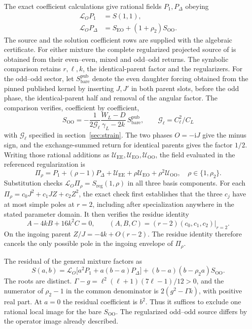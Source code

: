 \documentclass[11pt]{article}
\newcommand{\ii}{\mathrm{i}}
\newcommand{\EE}{\mathrm{EE}}
\newcommand{\EO}{\mathrm{EO}}
\newcommand{\OO}{\mathrm{OO}}
\begin{document}
The exact coefficient calculations give rational fields \(P_1,P_\Delta\) obeying
\begin{align}
 \mathcal L_O P_1&=S(1,1),\\
 \mathcal L_O P_\Delta&=S_{\EO}+(1+\rho_2)S_{\OO}.
 \label{eq:construction}
\end{align}
The source and the solution coefficient rows are supplied with the algebraic certificate.
For either mixture the complete regularized projected source of \cite{bucciotti} is obtained from their even--even, mixed and odd--odd returns.
The symbolic comparison retains \(r,\ell,k\), the identical-parent factor and the regularizers.
For the odd--odd sector, let \(S^{\mathrm{pub}}_{\mathrm{bare}}\) denote the even daughter forcing obtained from the pinned published kernel by inserting \(J,J'\) in both parent slots, before the odd phase, the identical-parent half and removal of the angular factor.
The comparison verifies, coefficient by coefficient,
\[
 S_{\OO}=-\frac{1}{2\mathcal G_\ell}
     \frac{W_L-D}{\gamma_L-2k}\,S^{\mathrm{pub}}_{\mathrm{bare}},
 \qquad \mathcal G_\ell=C_\ell^2/C_L
\]
with \(\mathcal G_\ell\) specified in section~\ref{sec:strain}.
The two phases \(O=-\ii J\) give the minus sign, and the exchange-summed return for identical parents gives the factor \(1/2\).
Writing those rational additions as \(\mathcal U_{\EE},\mathcal U_{\EO},\mathcal U_{\OO}\), the field evaluated in the referenced regularization is
\begin{equation}
 \Pi_\rho=P_1+(\rho-1)P_\Delta+
    \mathcal U_{\EE}+\rho\mathcal U_{\EO}+\rho^2\mathcal U_{\OO},
 \quad \rho\in\{1,\rho_2\}.
 \label{eq:Pi}
\end{equation}
Substitution checks \(\mathcal L_O\Pi_\rho=S_{\mathrm{reg}}(1,\rho)\) in all three basis components.
For each \(\Pi_\rho=c_0J^2+c_1JZ+c_2Z^2\), the exact check first establishes that the three \(c_j\) have at most simple poles at \(r=2\), including after specialization anywhere in the stated parameter domain.
It then verifies the residue identity
\begin{equation}
 A-4kB+16k^2C=0,\qquad
 (A,B,C)=\left.(r-2)(c_0,c_1,c_2)\right|_{r=2}.
 \label{eq:horizon-cancel}
\end{equation}
On the ingoing parent \(Z/J=-4k+O(r-2)\). The residue identity therefore cancels the only possible pole in the ingoing envelope of \(\Pi_\rho\).

The residual of the general mixture factors as
\begin{equation}
 S(a,b)=\mathcal L_O\big[a^2P_1+a(b-a)P_\Delta\big]
       +(b-a)(b-\rho_2 a)S_{\OO}.
 \label{eq:factor}
\end{equation}
The roots are distinct. \(\Gamma-g=\ell^2(\ell+1)(7\ell-1)/12>0\), and the numerator of \(\rho_2-1\) in the common denominator is \(2(g^2-\Gamma k)\), with positive real part.
At \(a=0\) the residual coefficient is \(b^2\).
Thus it suffices to exclude one rational local image for the bare \(S_{\OO}\).
The regularized odd--odd source differs by the operator image already described.
\end{document}
